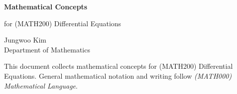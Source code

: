 \documentclass[11pt,oneside]{article}
\begin{document}
\thispagestyle{empty}

\begin{center}
    \vspace*{1.1cm}

    {\LARGE\bfseries Mathematical Concepts\par}

    \vspace{0.25cm}

    {\large for (MATH200) Differential Equations\par}

    \vspace{0.75cm}

    {\normalsize
    Jungwoo Kim\\
    Department of Mathematics\\
    \PohangUniversityOfScienceAndTechnology
    \par}
\end{center}

\vspace{0.45cm}

This document collects mathematical concepts for (MATH200) Differential Equations. General mathematical notation and writing follow \textit{(MATH000) Mathematical Language}.
\end{document}
